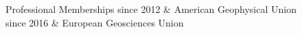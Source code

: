 
\begin{cvsection}{Professional Memberships}
  since 2012 & American Geophysical Union\\
  since 2016 & European Geosciences Union\\
\end{cvsection}
